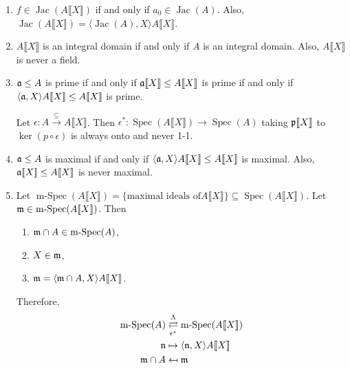 \begin{proposition}
\begin{enumerate}
        \item $f \in \operatorname{Jac}(A\llbracket X \rrbracket)$ if and only if $a_0 \in \operatorname{Jac}(A)$. Also, $\operatorname{Jac}(A\llbracket X \rrbracket) = \langle \operatorname{Jac}(A),X \rangle A\llbracket X \rrbracket$. 
        \item $A\llbracket X \rrbracket$ is an integral domain if and only if $A$ is an integral domain. Also, $A\llbracket X \rrbracket$ is never a field.
        \item $\mathfrak{a} \leq A$ is prime if and only if $\mathfrak{a} \llbracket X \rrbracket \leq A\llbracket X \rrbracket$ is prime if and only if $\langle \mathfrak{a},X \rangle A \llbracket X \rrbracket \leq A\llbracket X \rrbracket$ is prime. \par 
            Let $\epsilon: A \xrightarrow {\subseteq} A\llbracket X \rrbracket$. Then $\epsilon^*: \operatorname{Spec}(A\llbracket X \rrbracket) \to \operatorname{Spec}(A)$ taking $\mathfrak{p} \llbracket X \rrbracket$ to $\ker(p \circ \epsilon)$ is always onto and never 1-1.
        \item $\mathfrak{a} \leq A$ is maximal if and only if $\langle \mathfrak{a},X \rangle A \llbracket X \rrbracket \leq A \llbracket X \rrbracket$ is maximal. Also, $\mathfrak{a} \llbracket X \rrbracket \leq A\llbracket X \rrbracket$ is never maximal.
        \item Let $\operatorname{m-Spec}(A\llbracket X \rrbracket) = \{\text{maximal ideals of}A\llbracket X \rrbracket\} \subseteq \operatorname{Spec}(A\llbracket X \rrbracket)$. Let $\mathfrak{m} \in \operatorname{m-Spec}(A\llbracket X \rrbracket)$. Then 
            \begin{enumerate}
                \item $\mathfrak{m} \cap A \in \operatorname{m-Spec}(A)$,
                \item $X \in \mathfrak{m}$,
                \item $\mathfrak{m} = \langle \mathfrak{m} \cap A,X \rangle A\llbracket X \rrbracket$.
            \end{enumerate}
            \par Therefore,
            \begin{align*}
                \operatorname{m-Spec}(A) &\mathrel{\mathop{\rightleftarrows}^{\mathrm{\Lambda}}_{\mathrm{\epsilon^*}}} \operatorname{m-Spec}(A\llbracket X \rrbracket)  \\
                \mathfrak{n} & \mapsto \langle \mathfrak{n},X \rangle A\llbracket X \rrbracket \\
                \mathfrak{m} \cap A &\mapsfrom \mathfrak{m}
            \end{align*}
    \end{enumerate}
\end{proposition}

